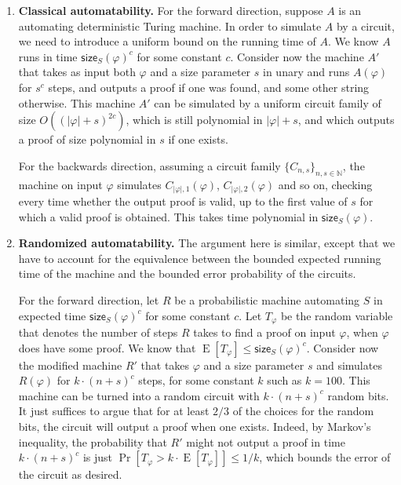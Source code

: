 \documentclass[11pt]{article}
\theoremstyle{definition}
\theoremstyle{plain}
\theoremstyle{remark}
\newcommand{\bN}{\mathbb{N}}
\newcommand{\size}[2]{\mathsf{size}_{#1}(#2)}
\begin{document}
\begin{enumerate}
        \item[(i)] \textbf{Classical automatability.} For the forward direction, suppose $A$ is an automating deterministic Turing machine. In order to simulate $A$ by a circuit, we need to introduce a uniform bound on the running time of $A$. We know $A$ runs in time $\mathsf{size}_S(\varphi)^c$ for some constant $c$. Consider now the machine $A'$ that takes as input both $\varphi$ and a size parameter $s$ in unary and runs $A(\varphi)$ for $s^c$ steps, and outputs a proof if one was found, and some other string otherwise. This machine $A'$ can be simulated by a uniform circuit family of size $O((|\varphi|+ s)^{2c})$, which is still polynomial in $|\varphi|+ s$, and which outputs a proof of size polynomial in $s$ if one exists.

        For the backwards direction, assuming a circuit family $\{ C_{n, s} \}_{n, s\in \bN}$, the machine on input $\varphi$ simulates $C_{|\varphi|, 1}(\varphi)$, $C_{|\varphi|, 2}(\varphi)$ and so on, checking every time whether the output proof is valid, up to the first value of $s$ for which a valid proof is obtained. This takes time polynomial in $\mathsf{size}_S(\varphi)$.
        
        \item[(ii)] \textbf{Randomized automatability.} The argument here is similar, except that we have to account for the equivalence between the bounded expected running time of the machine and the bounded error probability of the circuits.
        
        For the forward direction, let $R$ be a probabilistic machine automating $S$ in expected time $\mathsf{size}_S(\varphi)^c$ for some constant $c$. Let $T_\varphi$ be the random variable that denotes the number of steps $R$ takes to find a proof on input $\varphi$, when $\varphi$ does have some proof. We know that $\operatorname{E}[T_\varphi] \leq \size{S}{\varphi}^c$. Consider now the modified machine $R'$ that takes $\varphi$ and a size parameter $s$ and simulates $R(\varphi)$ for $k\cdot (n + s)^c$ steps, for some constant $k$ such as $k = 100$. This machine can be turned into a random circuit with $k\cdot (n + s)^c$ random bits. It just suffices to argue that for at least $2/3$ of the choices for the random bits, the circuit will output a proof when one exists. Indeed, by Markov's inequality, the probability that $R'$ might not output a proof in time $k\cdot (n + s)^c$ is just
        $\Pr[T_\varphi > k\cdot \operatorname{E}[T_\varphi]] \leq {1}/{k}$,
        which bounds the error of the circuit as desired.


\end{enumerate}
\end{document}

